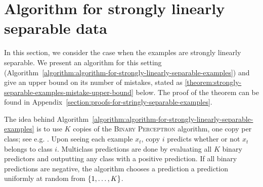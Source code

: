 \section{Algorithm for strongly linearly separable data}
\label{section:algorithm-for-strongly-linearly-separable-data}

In this section, we consider the case when the examples are strongly linearly
separable. We present an algorithm for this setting
(Algorithm~\ref{algorithm:algorithm-for-strongly-linearly-separable-examples})
and give an upper bound on its number of mistakes, stated as
\autoref{theorem:strongly-separable-examples-mistake-upper-bound} below. The
proof of the theorem can be found in
Appendix~\ref{section:proofs-for-stringly-separable-examples}.

The idea behind
Algorithm~\ref{algorithm:algorithm-for-strongly-linearly-separable-examples} is
to use $K$ copies of the \textsc{Binary Perceptron} algorithm, one copy per
class; see e.g. \citep[Section 3.3.1]{Shalev-Shwartz-2012}. Upon seeing each
example $x_t$, copy $i$ predicts whether or not $x_t$ belongs to class $i$.
Multiclass predictions are done by evaluating all $K$ binary predictors and
outputting any class with a positive prediction.  If all binary predictions are
negative, the algorithm chooses a prediction a prediction uniformly at random
from $\cbr{1,\ldots,K}$.


